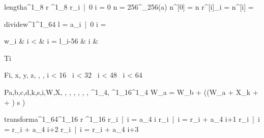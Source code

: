 \documentclass[12pt,a4paper]{book}
\begin{document}
\begin{eqcode}{length}{a}{}{^1_8}
    r \in {}^1_8 \lend
    r_i\  |\  0 \leq i  = 0 \lend
    n = 256^{\lfloor \log_{256}\left(a\right)\rfloor} \lend
    n^{[0]} = n \lend
    r^{[i]}_i =  \lend
    n^{[i]} =  \lend
     \lend
\end{eqcode}

\begin{eqcode}{divide}{w}{^1}{^1_{64}}
    l =  \lend
    a_i\  |\  0 \leq i  = 
        \begin{cases}
            w_i & i <  \lend
              & i =  \lend
            l_{i-56} & i   &  \lend
        \end{cases} \lend
     \lend
\end{eqcode}

\begin{eqcode}{T}{i}{}{}
     \lend
\end{eqcode}

\begin{eqcode}{F}{i, x, y, z}{, , ,
}{}
    \iif i < 16\   \lend
    \iif i < 32\   \lend
    \iif i < 48\   \lend
    \iif i < 64\   \lend
\end{eqcode}

\begin{eqcode}{P}{a,b,c,d,k,s,i,W,X}{, , ,
, , , , ^1_4,
^1_{16}}{^1_4}
    W_a = W_b + ((W_a + X_k +   + ) \ll s ) \lend
     \lend
\end{eqcode}

\begin{eqcode}{transform}{a}{^1_{64}}{^1_{16}}
    r \in {}^1_{16} \lend
    r_i\  |\  \forall i = a_{4 \cdot i}  \lend
    r_i\  |\  \forall i = r_i + a_{4 \cdot i+1}  \lend
    r_i\  |\  \forall i = r_i + a_{4 \cdot i+2}  \lend
    r_i\  |\  \forall i  = r_i + a_{4 \cdot i+3} \lend
     \lend
\end{eqcode}
\end{document}
